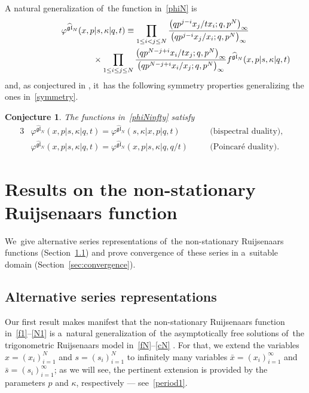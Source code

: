 \documentclass[pdftex]{sigma}%
\numberwithin{equation}{section}
\newtheorem{Conjecture}[Theorem]{Conjecture}
 { \theoremstyle{definition}
\newtheorem{Definition}[Theorem]{Definition}
\newtheorem{Remark}[Theorem]{Remark}
\newtheorem{Fact}[Theorem]{Fact}}
\newcommand{\bx}{\bar{x}}
\newcommand{\bs}{\bar{s}}
\begin{document}
A natural generalization of~the function in~\eqref{phiN} is
\begin{gather}
\varphi^{\widehat{\mathfrak{gl}}_N}(x,p|s,\kappa|q,t)\equiv
\prod_{1\leq i<j\leq N} \frac{\big(qp^{j-i}x_j/tx_i;q,p^N\big)_\infty}{\big(qp^{j-i}x_j/x_i;q,p^N\big)_\infty}\nonumber
\\ \hphantom{\varphi^{\widehat{\mathfrak{gl}}_N}(x,p|s,\kappa|q,t)\equiv}
{}\times\prod_{1\leq i\leq j\leq N} \frac{\big(qp^{N-j+i}x_i/tx_j;q,p^N\big)_\infty}{\big(qp^{N-j+i}x_i/x_j;q,p^N\big)_\infty}
 f^{\widehat{\mathfrak{gl}}_N}(x,p|s,\kappa|q,t)
\label{phiNinfty}
\end{gather}
and, as conjectured in \cite{S}, it~has the following symmetry properties generalizing
the ones in~\eqref{symmetry}.

\begin{Conjecture}The functions in~\eqref{phiNinfty} satisfy
\begin{alignat}{3}
& \varphi^{\widehat{\mathfrak{gl}}_N}(x,p|s,\kappa|q,t)= \varphi^{\widehat{\mathfrak{gl}}_N}(s,\kappa|x,p|q,t)\quad && \text{$($bispectral duality$)$},&\nonumber\\
&\varphi^{\widehat{\mathfrak{gl}}_N}(x,p|s,\kappa|q,t)= \varphi^{\widehat{\mathfrak{gl}}_N}(x,p|s,\kappa|q,q/t) \quad && \text{$($Poincar\'e duality$)$}.& \label{symmetry1}
\end{alignat}
\end{Conjecture}

\section{Results on the non-stationary Ruijsenaars function}\label{sec:results}

We~give alternative series representations of~the non-stationary Ruijsenaars functions (Section~\ref{sec:alternative}) and prove convergence of~these series in a~suitable domain (Section~\ref{sec:convergence}).
\subsection{Alternative series representations}
\label{sec:alternative}
Our first result makes manifest that the non-stationary Ruijsenaars function in~\eqref{f1}--\eqref{N1} is a~natural generalization of~the asymptotically free solutions of~the trigonometric Ruijsenaars model in~\eqref{fN}--\eqref{cN} .
For that, we extend the variables $x=(x_i)_{i=1}^N$ and $s=(s_i)_{i=1}^N$ to infinitely many variables $\bx=(x_i)_{i=1}^\infty$ and $\bs=(s_i)_{i=1}^\infty$; as we will see, the pertinent extension
is provided by the parameters $p$ and $\kappa$, respectively --- see~\eqref{period1}.
\end{document}
